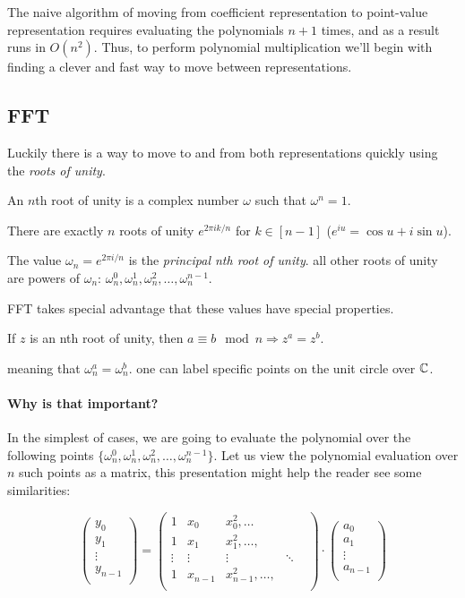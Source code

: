 The naive algorithm of moving from coefficient representation to point-value representation
requires evaluating the polynomials $n+1$ times, and as a result runs in $O(n^2)$.
Thus, to perform polynomial multiplication we'll begin with finding a clever and fast way to move between representations.
\subsection{FFT}
Luckily there is a way to move to and from both representations quickly using the \emph{roots of unity}.

\begin{definition}
An $n$th root of unity is a complex number $\omega$ such that
$\omega^n =1$.
\end{definition}

There are exactly $n$ roots of unity $e^{2\pi i k/n}$ for $k\in[n-1]$ 
($e^{iu}= \cos{u}+i \sin{u}$).

The value $\omega_n=e^{2\pi i/n}$ is the \emph{principal nth root of unity}.
all other roots of unity are powers of $\omega_n$:
 $\omega_n^0, \omega_n^1, \omega_n^2,\dots, \omega_n^{n-1}$.

FFT takes special advantage that these values have special properties.
\begin{lemma}\label{roots-of-unity-property}
If $z$ is an nth root of unity, then $ a \equiv b \mod n \Rightarrow z^a = z^b$.
\end{lemma}
meaning that $\omega_n^a = \omega_n^b$. one can label specific points on the unit circle over $\mathbb{C}$.

\paragraph{Why is that important?}

In the simplest of cases, we are going to evaluate the polynomial over the following
points $ \{\omega_n^0, \omega_n^1, \omega_n^2,\dots, \omega_n^{n-1}\}$.
Let us view the polynomial evaluation over $n$ such points as a matrix, this presentation
might help the reader see some similarities:


$$
\begin{pmatrix}
  y_0\\
  y_1\\
  \vdots \\
  y_{n-1}\\
\end{pmatrix}
=
\begin{pmatrix}
  1 & x_0 & x_0^2 ,\dots\\
  1 & x_1 & x_1^2, \dots,\\
  \vdots & \vdots & \vdots & \ddots & \\
  1 & x_{n-1} & x_{n-1}^2, \dots,\\
 \end{pmatrix}
 \cdot 
\begin{pmatrix}
  a_0\\
  a_1\\
  \vdots \\
  a_{n-1}\\
\end{pmatrix}
 $$

